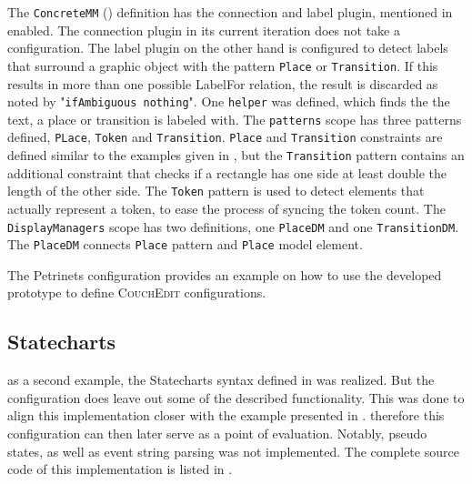 The \texttt{ConcreteMM} () definition has the connection and label  plugin, mentioned in  enabled. The connection plugin in its current iteration does not take a configuration. The label plugin on the other hand is configured to detect labels that surround a graphic object with the pattern \texttt{Place} or \texttt{Transition}. If this results in more than one possible LabelFor relation, the result is discarded as noted by "\texttt{ifAmbiguous nothing}". One \texttt{helper} was defined, which finds the the text, a place or transition is labeled with. The \texttt{patterns} scope has three patterns defined, \texttt{PLace}, \texttt{Token} and \texttt{Transition}. \texttt{Place} and \texttt{Transition} constraints are defined similar to the examples given in , but the \texttt{Transition} pattern contains an additional constraint that checks if a rectangle has one side at least double the length of the other side. The \texttt{Token} pattern is used to detect elements that actually represent a token, to ease the process of syncing the token count. The \texttt{DisplayManagers} scope has two definitions, one \texttt{PlaceDM} and one \texttt{TransitionDM}. The \texttt{PlaceDM} connects \texttt{Place} pattern and \texttt{Place} model element.

The Petrinets configuration provides an example on how to use the developed prototype to define \textsc{CouchEdit} configurations. 



\subsection{Statecharts}
\label{sec:state-impl}
as a second example, the Statecharts syntax defined in  was realized. But the configuration does leave out some of the described functionality. This was done to align this implementation closer with the example presented in \cite{nachreiner_couchedit_2020}. therefore this configuration can then later serve as a point of evaluation. Notably, pseudo states, as well as event string parsing was not implemented. The complete source code of this implementation is listed in . 

